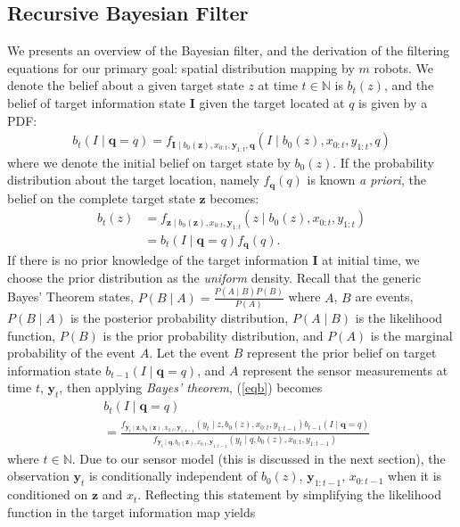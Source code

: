 \documentclass[journal]{IEEEtran}
\begin{document}
\subsection{Recursive Bayesian Filter}
We presents an overview of the Bayesian filter, and the derivation of the filtering equations for our primary goal: spatial distribution mapping by $m$ robots. We denote the belief about a given target state $z$ at time $t \in \mathbb{N}$ is $b_t(z)$, and the belief of target information state $\bm{I}$ given the target located at $q$ is given by a PDF:
\begin{align}
b_t(I \mid \bm{q} = q)= f_{\bm{I}\mid b_0(\bm{z}),{x}_{0:t},\bm{y}_{1:t},\bm{q}}
\left(
I \mid b_0(z),
{x}_{0:t},y_{1:t},q
\right)
\label{eqb}
\end{align}
where we denote the initial belief on target state by $b_0(z)$.
If the probability distribution about the target location, namely $f_{\bm{q}}(q)$ is known \emph{a priori}, the belief on the complete target state $\bm{z}$ becomes:
\begin{align}
b_t(z)&=
f_{\bm{z} \mid b_0(\bm{z}),{x}_{0:t},\bm{y}_{1:t}}
\left(
z \mid b_0(z),
{x}_{0:t},y_{1:t}
\right) \nonumber  \\
&=
b_t(I\mid \bm{q}=q)f_{\bm{q}}(q). 
\label{eq0}
\end{align}
If there is no prior knowledge of the target information $\bm{I}$ at initial time, we
choose the prior distribution as the \emph{uniform} density. Recall that the generic Bayes' Theorem states,
$
P(B\mid A) = \frac{P(A \mid B)P(B)}{P(A)}
$
where $A$, $B$ are events, $P(B\mid A)$ is the posterior probability distribution, $P(A \mid B)$ is the likelihood function, $P(B)$ is the prior probability distribution, and $P(A)$ is the marginal probability of the event $A$. Let the event $B$ represent the prior belief on target information state $b_{t-1}(I\mid \bm{q}=q)$, and $A$ represent the sensor measurements at time $t$, $\bm{y}_t$, then applying \emph{Bayes' theorem}, (\ref{eqb}) becomes
{\small{
\begin{align*}
&b_{t}(I \mid \bm{q} =q)\\
&=
\frac{
	f_{\bm{y}_{t} \mid
\bm{z},b_0(\bm{z}),
{x}_{0:t},\bm{y}_{1:t-1}	
}\left(
	y_{t} \mid
	z,b_0(z),
	{x}_{0:t},y_{1:t-1}
\right)
b_{t-1}(I\mid \bm{q} = q)
}
{
f_{\bm{y}_{t} \mid
		\bm{q},
		b_0(\bm{z}),
		{x}_{0:t},\bm{y}_{1:t-1}	
	}\left(
	y_{t} \mid
	q,b_0(z),
	{x}_{0:t},y_{1:t-1}
	\right)
}
\end{align*}}}where $t \in \mathbb{N}$.
Due to our sensor model (this is discussed in the next section), the observation $\bm{y}_{t}$ is conditionally independent of $b_0(z)$, $\bm{y}_{1:t-1}$, $x_{0:t-1}$ when it is  conditioned on $\bm{z}$ and $x_t$. Reflecting this statement by simplifying the likelihood function in the target information map yields
\end{document}
